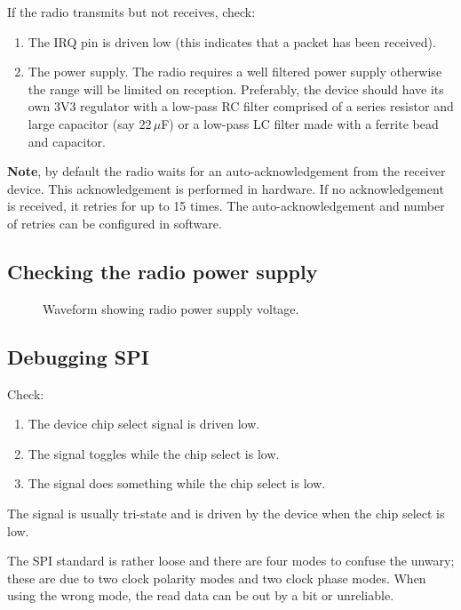 \begin{enumerate}
If the radio transmits but not receives, check:

\begin{enumerate}
\item
  The IRQ pin is driven low (this indicates that a packet has been
  received).
\item
  The power supply. The radio requires a well filtered power supply
  otherwise the range will be limited on reception. Preferably, the
  device should have its own 3V3 regulator with a low-pass RC filter
  comprised of a series resistor and large capacitor (say 22\,$\mu$F)
  or a low-pass LC filter made with a ferrite bead and capacitor.
\end{enumerate}

\textbf{Note}, by default the radio waits for an auto-acknowledgement
from the receiver device. This acknowledgement is performed in hardware.
If no acknowledgement is received, it retries for up to 15 times. The
auto-acknowledgement and number of retries can be configured in
software.

\subsection{Checking the radio power supply}
\label{checking-the-radio-power-supply}

\begin{figure}[!h]
  \centering
  \caption{Waveform showing radio power supply voltage.}
\end{figure}


\subsection{Debugging SPI}
\label{debugging-spi}

Check:
%
\begin{enumerate}
\item The device chip select signal is driven low.
\item The  signal toggles while the chip select is low.
\item The  signal does something while the chip select is low.
\end{enumerate}
%
The  signal is usually tri-state and is driven by the
device when the chip select is low.

The SPI standard is rather loose and there are four modes to confuse
the unwary; these are due to two clock polarity modes and two clock
phase modes.  When using the wrong mode, the read data can be out by a
bit or unreliable.


\end{enumerate}

